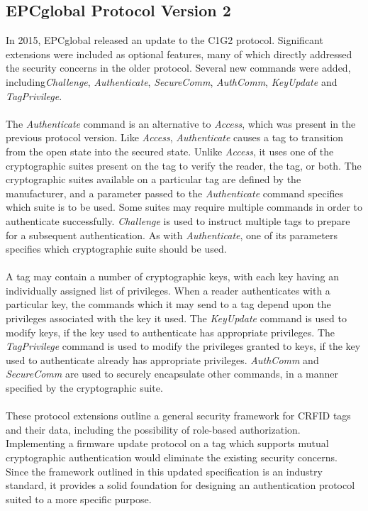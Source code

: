 \documentclass[journal]{IEEEtran}
\begin{document}
    \subsection{EPCglobal Protocol Version 2}
        In 2015, EPCglobal released an update to the C1G2 protocol.\cite{epc20}
        Significant extensions were included as optional features, many of which directly addressed the security concerns in the older protocol.
        Several new commands were added, including\textit{Challenge}, \textit{Authenticate}, \textit{SecureComm}, \textit{AuthComm}, \textit{KeyUpdate} and \textit{TagPrivilege}.
        \\\\
        The \textit{Authenticate} command is an alternative to \textit{Access}, which was present in the previous protocol version.
        Like \textit{Access}, \textit{Authenticate} causes a tag to transition from the open state into the secured state.
        Unlike \textit{Access}, it uses one of the cryptographic suites present on the tag to verify the reader, the tag, or both.
        The cryptographic suites available on a particular tag are defined by the manufacturer, and a parameter passed to the \textit{Authenticate} command specifies which suite is to be used.
        Some suites may require multiple commands in order to authenticate successfully.
        \textit{Challenge} is used to instruct multiple tags to prepare for a subsequent authentication.
        As with \textit{Authenticate}, one of its parameters specifies which cryptographic suite should be used.
        \\\\
        A tag may contain a number of cryptographic keys, with each key having an individually assigned list of privileges.
        When a reader authenticates with a particular key, the commands which it may send to a tag depend upon the privileges associated with the key it used.
        The \textit{KeyUpdate} command is used to modify keys, if the key used to authenticate has appropriate privileges.
        The \textit{TagPrivilege} command is used to modify the privileges granted to keys, if the key used to authenticate already has appropriate privileges.
        \textit{AuthComm} and \textit{SecureComm} are used to securely encapsulate other commands, in a manner specified by the cryptographic suite.
        \\\\
        These protocol extensions outline a general security framework for CRFID tags and their data, including the possibility of role-based authorization.
        Implementing a firmware update protocol on a tag which supports mutual cryptographic authentication would eliminate the existing security concerns.
        Since the framework outlined in this updated specification is an industry standard, it provides a solid foundation for designing an authentication protocol suited to a more specific purpose.
\end{document}
